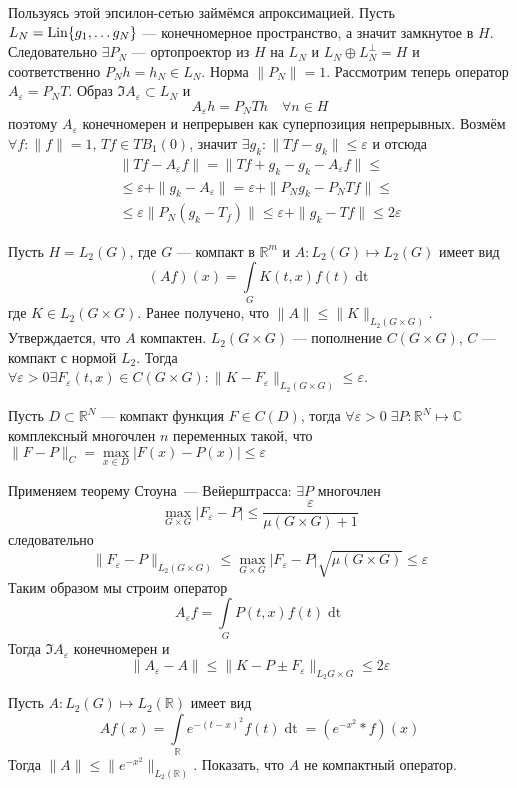 \documentclass[14pt]{extarticle}
\begin{document}
\begin{Proof}
    Пользуясь этой эпсилон-сетью займёмся апроксимацией.
    Пусть $L_N = \operatorname{Lin} \{g_1,\dots g_N\}$ --- конечномерное пространство, а
    значит замкнутое в $H$.
    Следовательно $\exists P_N$ --- ортопроектор из $H$ на $L_N$ и 
    $L_N \oplus L_N^\perp = H$ и соответственно $P_N h = h_N \in L_N$.
    Норма $\|P_N\| = 1$.
    Рассмотрим теперь оператор $A_\varepsilon = P_N T$.
    Образ $\Im A_\varepsilon \subset L_N$ и
    $$
    A_\varepsilon h = P_N T h \quad \forall n \in H
    $$
    поэтому $A_\varepsilon$ конечномерен и непрерывен как суперпозиция 
    непрерывных.
    Возмём $\forall f\colon \|f\| = 1$, $Tf \in TB_1(0)$, значит
    $\exists g_k\colon \|Tf - g_k\| \le \varepsilon$ и отсюда
    \begin{multline*}
    \|Tf - A_\varepsilon f\| = \|Tf + g_k - g_k - A_\varepsilon f\| \le \\ \le
    \varepsilon + \|g_k - A_\varepsilon\| = \varepsilon + \|P_N g_k - P_N T f\|
    \le \\ \le\varepsilon  \|P_N(g_k - T_f)\| \le \varepsilon + \|g_k - Tf\| 
    \le 2 \varepsilon 
    \end{multline*}
\end{Proof}
\begin{Prim}
    Пусть $H = L_2(G)$, где $G$ --- компакт в $\mathbb R^m$ и $A : L_2(G)
    \mapsto L_2(G)$ имеет вид
    $$
    (Af)(x) = \int\limits_G K(t, x)f(t)\mathop{dt}
    $$
    где $K \in L_2(G \times G)$.
    Ранее получено, что $\|A\| \le \|K\|_{L_2(G \times G)}$.
    Утверждается, что $A$ компактен.
    $L_2(G \times G)$ --- пополнение $C(G \times G)$, $C$ --- компакт с нормой
    $L_2$.
    Тогда $\forall \varepsilon > 0 \exists F_\varepsilon(t, x) \in
    C(G \times G)\colon \|K - F_\varepsilon\|_{L_2(G \times G)} \le 
    \varepsilon$.
    \begin{Theor}
        Пусть $D \subset \mathbb R^N$ --- компакт функция $F \in C(D)$, тогда
        $\forall \varepsilon > 0\; \exists P : \mathbb R^N \mapsto \mathbb C$
        комплексный многочлен $n$ переменных такой, что
        $\|F - P\|_C = \max\limits_{x \in D} |F(x) - P(x)| \le \varepsilon$
    \end{Theor}
    
    Применяем теорему Стоуна~--- Вейерштрасса: $\exists P$ многочлен
    $$
    \max_{G \times G}|F_\varepsilon - P| \le \dfrac{\varepsilon}{\mu(G \times 
    G) + 1}
    $$
    следовательно
    $$
    \|F_\varepsilon - P\|_{L_2(G \times G)} \le \max_{G \times G}|F_\varepsilon 
    - P|\sqrt{\mu(G \times G)} \le \varepsilon
    $$
    Таким образом мы строим оператор
    $$
    A_\varepsilon f = \int \limits_G P(t, x) f(t) \mathop{dt}
    $$
    Тогда $\Im A_\varepsilon$ конечномерен и
    $$
    \|A_\varepsilon - A\| \le \|K - P \pm F_\varepsilon\|_{L_2{G \times G}} \le
    2 \varepsilon
    $$
\end{Prim}
\begin{Upr}
    Пусть $A : L_2(G) \mapsto L_2(\mathbb R)$ имеет вид
    $$
    Af(x) = \int\limits_{\mathbb R} e^{-(t - x)^2}f(t)\mathop{dt} = (e^{-x^2} *
    f)(x)
    $$
    Тогда $\|A\| \le \|e^{-x^2}\|_{L_2(\mathbb R)}$. 
    Показать, что $A$ не компактный оператор.
\end{Upr}
\end{document}
